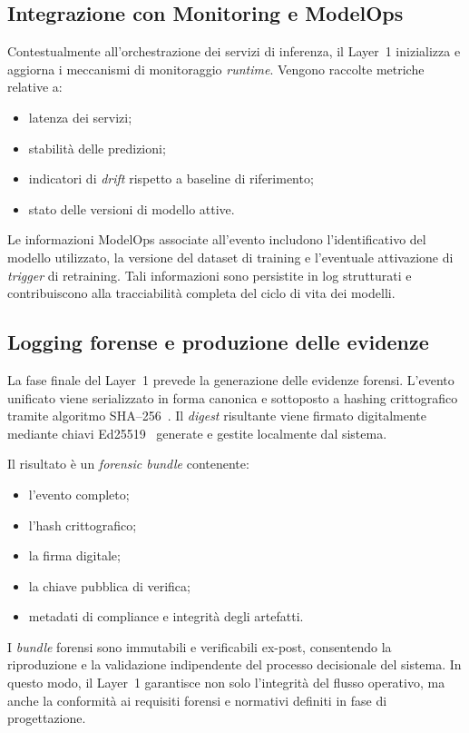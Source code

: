 \subsection{Integrazione con Monitoring e ModelOps}

Contestualmente all’orchestrazione dei servizi di inferenza, il Layer~1 inizializza e aggiorna i meccanismi di monitoraggio \textit{runtime}.
Vengono raccolte metriche relative a:
\begin{itemize}
	\item latenza dei servizi;
	\item stabilità delle predizioni;
	\item indicatori di \textit{drift} rispetto a baseline di riferimento;
	\item stato delle versioni di modello attive.
\end{itemize}

Le informazioni ModelOps associate all’evento includono l’identificativo del modello utilizzato, la versione del dataset di training e l’eventuale attivazione di \textit{trigger} di retraining.
Tali informazioni sono persistite in log strutturati e contribuiscono alla tracciabilità completa del ciclo di vita dei modelli.

\subsection{Logging forense e produzione delle evidenze}

La fase finale del Layer~1 prevede la generazione delle evidenze forensi.
L’evento unificato viene serializzato in forma canonica e sottoposto a hashing crittografico tramite algoritmo SHA--256~\cite{rfc6234_sha}.
Il \textit{digest} risultante viene firmato digitalmente mediante chiavi Ed25519~\cite{rfc8032_eddsa} generate e gestite localmente dal sistema.

Il risultato è un \emph{forensic bundle} contenente:
\begin{itemize}
	\item l’evento completo;
	\item l’hash crittografico;
	\item la firma digitale;
	\item la chiave pubblica di verifica;
	\item metadati di compliance e integrità degli artefatti.
\end{itemize}

I \textit{bundle} forensi sono immutabili e verificabili ex-post, consentendo la riproduzione e la validazione indipendente del processo decisionale del sistema.
In questo modo, il Layer~1 garantisce non solo l’integrità del flusso operativo, ma anche la conformità ai requisiti forensi e normativi definiti in fase di progettazione.

